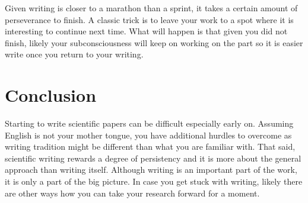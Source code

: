 Given writing is closer to a marathon than a sprint, it takes a certain amount of perseverance to finish.
A classic trick is to leave your work to a spot where it is interesting to continue next time.
What will happen is that given you did not finish, likely your subconsciousness will keep on working on the part so it is easier write once you return to your writing.

\section{Conclusion}

Starting to write scientific papers can be difficult especially early on.
Assuming English is not your mother tongue, you have additional hurdles to overcome as writing tradition might be different than what you are familiar with. 
That said, scientific writing rewards a degree of persistency and it is more about the general approach than writing itself.
Although writing is an important part of the work, it is only a part of the big picture.
In case you get stuck with writing, likely there are other ways how you can take your research forward for a moment.
